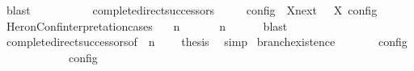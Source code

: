 \begin{isabellebody}
\ blast\isanewline
\ \ \ \ \ \ \isamarkupfalse%
\isanewline
\ \ \isamarkupfalse%
%
\endisatagproof
{\isafoldproof}%
%
\isadelimproof
\isanewline
%
\endisadelimproof
\isanewline
{}\isamarkupfalse%
\ complete{\isacharunderscore}direct{\isacharunderscore}successors{\isacharprime}{\isacharcolon}\isanewline
\ \ \ {\isacartoucheopen}{\isasymlbrakk}\ {\isasymS}\ {\isasymrbrakk}\isactrlsub c\isactrlsub o\isactrlsub n\isactrlsub f\isactrlsub i\isactrlsub g\ {\isasymsubseteq}\ {\isacharparenleft}{\isasymUnion}X{\isasymin}{\isasymC}\isactrlsub n\isactrlsub e\isactrlsub x\isactrlsub t\ {\isasymS}{\isachardot}\ {\isasymlbrakk}\ X\ {\isasymrbrakk}\isactrlsub c\isactrlsub o\isactrlsub n\isactrlsub f\isactrlsub i\isactrlsub g{\isacharparenright}{\isacartoucheclose}\isanewline
%
\isadelimproof
%
\endisadelimproof
%
\isatagproof
{}\isamarkupfalse%
\ {\isacharminus}\isanewline
\ \ \isamarkupfalse%
\ HeronConf{\isacharunderscore}interpretation{\isachardot}cases\ \isamarkupfalse%
\ {\isasymGamma}\ n\ {\isasymPsi}\ {\isasymPhi}\ \ {\isacartoucheopen}{\isasymS}\ {\isacharequal}\ {\isacharparenleft}{\isasymGamma}{\isacharcomma}\ n\ {\isasymturnstile}\ {\isasymPsi}\ {\isasymtriangleright}\ {\isasymPhi}{\isacharparenright}{\isacartoucheclose}\ \isamarkupfalse%
\ blast\isanewline
\ \ \isamarkupfalse%
\ complete{\isacharunderscore}direct{\isacharunderscore}successors{\isacharbrackleft}of\ {\isacartoucheopen}{\isasymGamma}{\isacartoucheclose}\ {\isacartoucheopen}n{\isacartoucheclose}\ {\isacartoucheopen}{\isasymPsi}{\isacartoucheclose}\ {\isacartoucheopen}{\isasymPhi}{\isacartoucheclose}{\isacharbrackright}\ \isamarkupfalse%
\ {\isacharquery}thesis\ \isamarkupfalse%
\ simp\isanewline
{}\isamarkupfalse%
%
\endisatagproof
{\isafoldproof}%
%
\isadelimproof
\isanewline
%
\endisadelimproof
\isanewline
{}\isamarkupfalse%
\ branch{\isacharunderscore}existence{\isacharcolon}\isanewline
\ \ \ {\isacartoucheopen}{\isasymrho}\ {\isasymin}\ {\isasymlbrakk}\ {\isasymS}\ {\isasymrbrakk}\isactrlsub c\isactrlsub o\isactrlsub n\isactrlsub f\isactrlsub i\isactrlsub g{\isacartoucheclose}\isanewline
\ \ \ {\isacartoucheopen}{\isasymexists}{\isasymS}\ {\isacharparenleft}{\isasymS}\ {\isasymhookrightarrow}\ {\isasymS}\ {\isasymand}\ {\isacharparenleft}{\isasymrho}\ {\isasymin}\ {\isasymlbrakk}\ {\isasymS}\ {\isasymrbrakk}\isactrlsub c\isactrlsub o\isactrlsub n\isactrlsub f\isactrlsub i\isactrlsub g{\isacharparenright}{\isacartoucheclose}\isanewline

\end{isabellebody}
